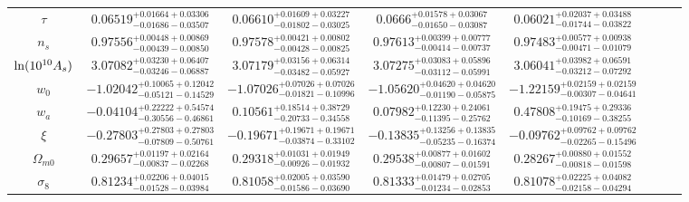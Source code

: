 \documentclass[superscriptaddress,oneolumn,secnumarabic,
amssymb,amsmath,nobibnotes,aps,prd,showpacs,nofootinbib]{revtex4}%
\begin{document}
\begin{itemize}
\begin{table}
\begin{tabular}{cccccccc}
$\tau$ & $    0.06519_{-    0.01686-    0.03507}^{+    0.01664+    0.03306}$ & $    0.06610_{-    0.01802-    0.03025}^{+    0.01609+    0.03227}$ & $0.0666_{-    0.01650-    0.03087}^{+    0.01578+    0.03067}$ &$    0.06021_{-    0.01744-    0.03822}^{+    0.02037+    0.03488}$ \\


$n_s$ & $    0.97556_{-    0.00439-    0.00850}^{+    0.00448+    0.00869}$ & $    0.97578_{-    0.00428-    0.00825}^{+    0.00421+    0.00802}$ & $0.97613_{-    0.00414-    0.00737}^{+ 0.00399+    0.00777}$ & $ 0.97483_{-    0.00471-    0.01079}^{+    0.00577+    0.00938}$\\


${\rm{ln}}(10^{10} A_s)$ & $    3.07082_{-    0.03246-    0.06887}^{+    0.03230+    0.06407}$ & $    3.07179_{-    0.03482-    0.05927}^{+    0.03156+    0.06314}$ & $3.07275_{-    0.03112-    0.05991}^{+    0.03083+    0.05896}$ &$    3.06041_{-    0.03212-    0.07292}^{+    0.03982+    0.06591}$\\


$w_0$ & $ -1.02042_{-    0.05121-    0.14529}^{+    0.10065+    0.12042}$ & $   -1.07026_{-    0.01821-    0.10996}^{+    0.07026+    0.07026}$ & $-1.05620_{-    0.01190-    0.05875}^{+    0.04620+    0.04620}$ &$   -1.22159_{-    0.00307-    0.04641}^{+    0.02159+    0.02159}$\\

$w_a$ & $   -0.04104_{-    0.30556-    0.46861}^{+    0.22222+    0.54574}$ & $    0.10561_{-    0.20733-    0.34558}^{+    0.18514+    0.38729}$ & $0.07982_{-    0.11395-    0.25762}^{+    0.12230+    0.24061}$ &$    0.47808_{-    0.10169-    0.38255}^{+    0.19475+    0.29336}$\\

$\xi$ & $   -0.27803_{-    0.07809-    0.50761}^{+    0.27803 +  0.27803}$ & $   -0.19671_{-    0.03874-    0.33102}^{+    0.19671+    0.19671}$  & $-0.13835_{-    0.05235-    0.16374}^{+    0.13256+    0.13835}$ &$   -0.09762_{-    0.02265-    0.15496}^{+    0.09762+    0.09762}$\\

$\Omega_{m0}$ & $    0.29657_{-    0.00837-    0.02268}^{+    0.01197+    0.02164}$ & $    0.29318_{-    0.00926-    0.01932}^{+    0.01031 +    0.01949}$ & $0.29538_{-    0.00807-    0.01591}^{+    0.00877+    0.01602}$ &$    0.28267_{-    0.00818-    0.01598}^{+    0.00880+    0.01552}$\\

$\sigma_8$ & $    0.81234_{-    0.01528-    0.03984}^{+    0.02206+    0.04015}$ & $    0.81058_{-    0.01586-    0.03690}^{+    0.02005+    0.03590}$ & $0.81333_{-    0.01234-    0.02853}^{+    0.01479+    0.02705}$ &$    0.81078_{-    0.02158-    0.04294}^{+    0.02225+    0.04082}$\\


\end{tabular}
\end{table}
\end{itemize}
\end{document}
